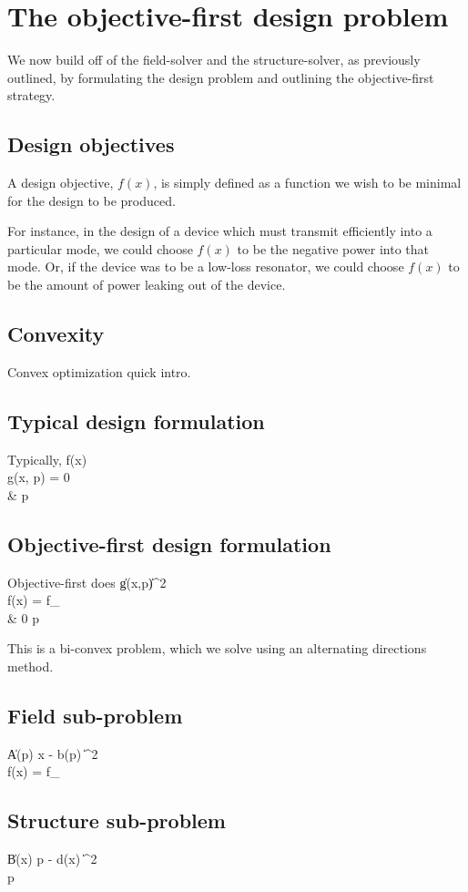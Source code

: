 
\section{The objective-first design problem}
We now build off of the field-solver and the structure-solver,
    as previously outlined,
    by formulating the design problem
    and outlining the objective-first strategy.

\subsection{Design objectives}
A design objective, $f(x)$, is simply defined as
    a function we wish to be minimal 
    for the design to be produced.

For instance, in the design of a device
    which must transmit efficiently into a particular mode,
    we could choose $f(x)$ to be the negative power into that mode.
Or, if the device was to be a low-loss resonator,
    we could choose $f(x)$ to be the amount of power leaking 
    out of the device.

\subsection{Convexity}
Convex optimization quick intro.

\subsection{Typical design formulation}
Typically,
\BA {} f(x) \\
    \subto g(x, p) = 0 \\
        & p  \EA

\subsection{Objective-first design formulation}
Objective-first does 
\BA {} \|g(x,p)\|^2 \\
    \subto f(x) = f_ \\
        & 0 \le p  \EA

This is a bi-convex problem, which we solve using an alternating directions method.

\subsection{Field sub-problem}
\BA {} \| A(p) x - b(p) \|^2 \\
    \subto f(x) = f_ \EA

\subsection{Structure sub-problem}
\BA {} \| B(x) p - d(x) \|^2 \\
     \le p  \EA

